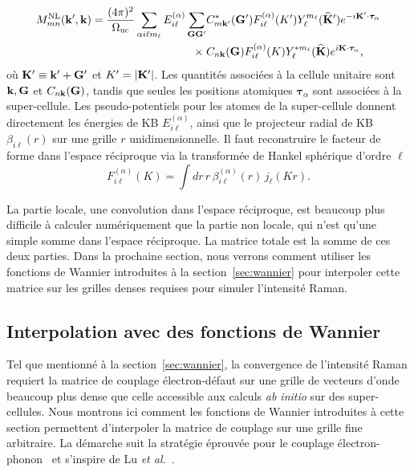 \begin{equation}
\begin{aligned}
    M_{mn}^\text{NL}(\mathbf{k}',\mathbf{k}) = \frac{(4\pi)^2}{\Omega_\text{uc}}\sum_{\alpha i\ell m_\ell}E_{i\ell}^{(\alpha)}\sum_{\mathbf{G}\mathbf{G}'}
    &C_{m\mathbf{k}'}^*(\mathbf{G}')F_{i\ell}^{(\alpha)}(K')Y_{\ell}^{m_\ell}(\widehat{\mathbf{K}}')e^{-i\mathbf{K}'\cdot\bm{\tau}_{\alpha}}\\
    \times\;&C_{n\mathbf{k}}(\mathbf{G})F_{i\ell}^{(\alpha)}(K)Y_\ell^{*m_\ell}(\widehat{\mathbf{K}})e^{i\mathbf{K}\cdot\bm{\tau}_\alpha},\label{eqn:MNL_final}
\end{aligned}
\end{equation}
où $\mathbf{K}'\equiv \mathbf{k}'+\mathbf{G}'$ et $K'=|\mathbf{K}'|$. Les quantités associées à la cellule unitaire sont $\mathbf{k}, \mathbf{G}$ et $C_{n\mathbf{k}}(\mathbf{G})$, tandis que seules les positions atomiques $\bm{\tau}_\alpha$ sont associées à la super-cellule. Les pseudo-potentiels pour les atomes de la super-cellule donnent directement les énergies de KB $E_{i\ell}^{(\alpha)}$, ainsi que le projecteur radial de KB $\beta_{i\ell}(r)$ sur une grille $r$ unidimensionnelle. Il faut reconstruire le facteur de forme dans l'espace réciproque via la transformée de Hankel sphérique d'ordre $\ell$
\begin{equation}
    F_{i\ell}^{(\alpha)}(K)=\int dr\,r\,\beta_{i\ell}^{(\alpha)}(r)\,j_\ell(Kr).\label{eqn:Hankel_sphérique}
\end{equation}

La partie locale, une convolution dans l'espace réciproque, est beaucoup plus difficile à calculer numériquement que la partie non locale, qui n'est qu'une simple somme dans l'espace réciproque. La matrice totale est la somme de ces deux parties. Dans la prochaine section, nous verrons comment utiliser les fonctions de Wannier introduites à la section~\ref{sec:wannier} pour interpoler cette matrice sur les grilles denses requises pour simuler l'intensité Raman.

\subsection{Interpolation avec des fonctions de Wannier}\label{sec:interp_wannier_M}

Tel que mentionné à la section~\ref{sec:wannier}, la convergence de
l'intensité Raman requiert la matrice de couplage électron-défaut sur une
grille de vecteurs d'onde beaucoup plus dense que celle accessible aux
calculs \textit{ab initio} sur des super-cellules. Nous montrons ici comment les
fonctions de Wannier introduites à cette section permettent d'interpoler
la matrice de couplage sur une grille fine arbitraire. La démarche suit
la stratégie éprouvée pour le couplage électron-phonon~\cite{giustinoElectronphononInteractionUsing2007a} et s'inspire de Lu \textit{et al.}~\cite{luInitioElectrondefectInteractions2020}.

